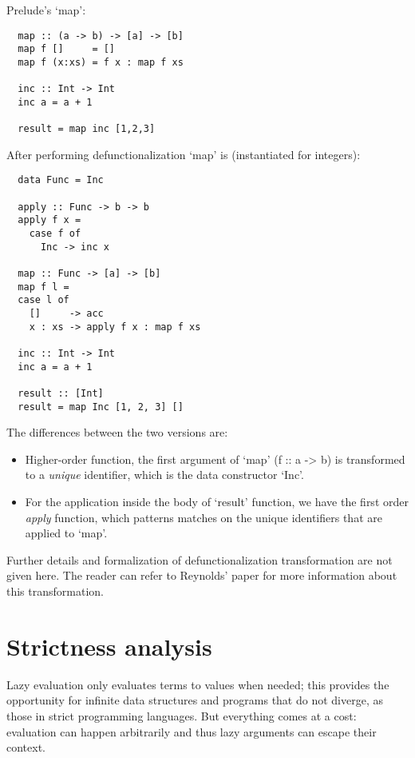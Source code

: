 \documentclass[diploma]{softlab-thesis}
\begin{document}
Prelude's `map':

\begin{verbatim}
  map :: (a -> b) -> [a] -> [b]
  map f []     = []
  map f (x:xs) = f x : map f xs

  inc :: Int -> Int 
  inc a = a + 1
  
  result = map inc [1,2,3]
\end{verbatim}

After performing defunctionalization `map' is (instantiated for integers):
\begin{verbatim}
  data Func = Inc 

  apply :: Func -> b -> b
  apply f x =
    case f of
      Inc -> inc x

  map :: Func -> [a] -> [b]
  map f l =
  case l of
    []     -> acc
    x : xs -> apply f x : map f xs

  inc :: Int -> Int 
  inc a = a + 1

  result :: [Int]
  result = map Inc [1, 2, 3] []
\end{verbatim}

The differences between the two versions are:
\begin{itemize}
  \item Higher-order function, the first argument of `map' (f :: a -> b) is 
  transformed to a \textit{unique} identifier, which is the data constructor `Inc'.
  \item For the application inside the body of `result' function, we have the first order \textit{apply}
  function, which patterns matches on the unique identifiers that are applied to `map'.
\end{itemize}

Further details and formalization of defunctionalization transformation are not given here. 
The reader can refer to Reynolds' paper for more information about this transformation.

\section {Strictness analysis}
\label{sec:strictness-analysis}

Lazy evaluation only evaluates terms to values when needed; this provides the 
opportunity for infinite data structures and programs that do not diverge, as those in 
strict programming languages. But everything comes at a cost: evaluation can happen 
arbitrarily and thus lazy arguments can escape their context.
\end{document}

